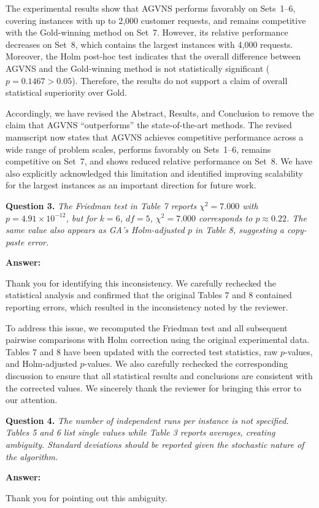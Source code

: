 \documentclass[11pt]{article}
\newcommand{\question}[2]{\vspace{0.5em}\noindent\textbf{Question #1.} \emph{#2}\par}
\newcommand{\answer}{\noindent\textbf{Answer:}\par}
\begin{document}
The experimental results show that AGVNS performs favorably on Sets~1--6, covering instances with up to 2,000 customer requests, and remains competitive with the Gold-winning method on Set~7. However, its relative performance decreases on Set~8, which contains the largest instances with 4,000 requests. Moreover, the Holm post-hoc test indicates that the overall difference between AGVNS and the Gold-winning method is not statistically significant ($p=0.1467>0.05$). Therefore, the results do not support a claim of overall statistical superiority over Gold.

Accordingly, we have revised the Abstract, Results, and Conclusion to remove the claim that AGVNS ``outperforms'' the state-of-the-art methods. The revised manuscript now states that AGVNS achieves competitive performance across a wide range of problem scales, performs favorably on Sets~1--6, remains competitive on Set~7, and shows reduced relative performance on Set~8. We have also explicitly acknowledged this limitation and identified improving scalability for the largest instances as an important direction for future work.

\question{3}{The Friedman test in Table 7 reports $\chi^2 = 7.000$ with $p = 4.91 \times 10^{-12}$, but for $k = 6$, $df = 5$, $\chi^2 = 7.000$ corresponds to $p \approx 0.22$. The same value also appears as GA's Holm-adjusted $p$ in Table 8, suggesting a copy-paste error.}
\answer
Thank you for identifying this inconsistency. We carefully rechecked the statistical analysis and confirmed that the original Tables 7 and 8 contained reporting errors, which resulted in the inconsistency noted by the reviewer.

To address this issue, we recomputed the Friedman test and all subsequent pairwise comparisons with Holm correction using the original experimental data. Tables 7 and 8 have been updated with the corrected test statistics, raw $p$-values, and Holm-adjusted $p$-values. We also carefully rechecked the corresponding discussion to ensure that all statistical results and conclusions are consistent with the corrected values. We sincerely thank the reviewer for bringing this error to our attention.

\question{4}{The number of independent runs per instance is not specified. Tables 5 and 6 list single values while Table 3 reports averages, creating ambiguity. Standard deviations should be reported given the stochastic nature of the algorithm.}
\answer
Thank you for pointing out this ambiguity.
\end{document}
